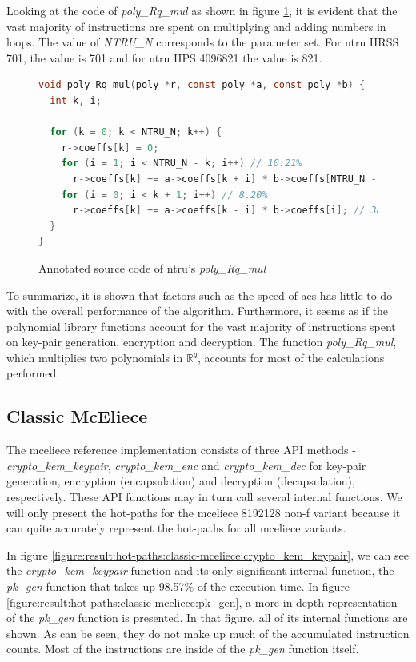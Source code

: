 Looking at the code of \textit{poly\_Rq\_mul} as shown in figure \ref{figure:result:hot-paths:ntru:poly_Rq_mul}, it is evident that the vast majority of instructions are spent on multiplying and adding numbers in loops. The value of \textit{NTRU\_N} corresponds to the parameter set. For \gls{ntru} HRSS 701, the value is 701 and for \gls{ntru} HPS 4096821 the value is 821.

\begin{figure}[H]
    \centering
    \begin{lstlisting}[language=C]
void poly_Rq_mul(poly *r, const poly *a, const poly *b) {
  int k, i;

  for (k = 0; k < NTRU_N; k++) {
    r->coeffs[k] = 0;
    for (i = 1; i < NTRU_N - k; i++) // 10.21%
      r->coeffs[k] += a->coeffs[k + i] * b->coeffs[NTRU_N - i]; // 42.75%
    for (i = 0; i < k + 1; i++) // 8.20%
      r->coeffs[k] += a->coeffs[k - i] * b->coeffs[i]; // 38.79%
  }
}
    \end{lstlisting}
    \caption{Annotated source code of \gls{ntru}'s \textit{poly\_Rq\_mul}}
    \label{figure:result:hot-paths:ntru:poly_Rq_mul}
\end{figure}

To summarize, it is shown that factors such as the speed of \gls{aes} has little to do with the overall performance of the algorithm. Furthermore, it seems as if the polynomial library functions account for the vast majority of instructions spent on key-pair generation, encryption and decryption. The function \textit{poly\_Rq\_mul}, which multiplies two polynomials in $\mathbb{R}^q$, accounts for most of the calculations performed.

\subsection{Classic McEliece}
The \gls{mceliece} reference implementation consists of three API methods - \textit{crypto\_kem\_keypair}, \textit{crypto\_kem\_enc} and \textit{crypto\_kem\_dec} for key-pair generation, encryption (encapsulation) and decryption (decapsulation), respectively. These API functions may in turn call several internal functions. We will only present the hot-paths for the \gls{mceliece} 8192128 non-f variant because it can quite accurately represent the hot-paths for all \gls{mceliece} variants.

In figure \ref{figure:result:hot-paths:classic-mceliece:crypto_kem_keypair}, we can see the \textit{crypto\_kem\_keypair} function and its only significant internal function, the \textit{pk\_gen} function that takes up 98.57\% of the execution time. In figure \ref{figure:result:hot-paths:classic-mceliece:pk_gen}, a more in-depth representation of the \textit{pk\_gen} function is presented. In that figure, all of its internal functions are shown. As can be seen, they do not make up much of the accumulated instruction counts. Most of the instructions are inside of the \textit{pk\_gen} function itself.

